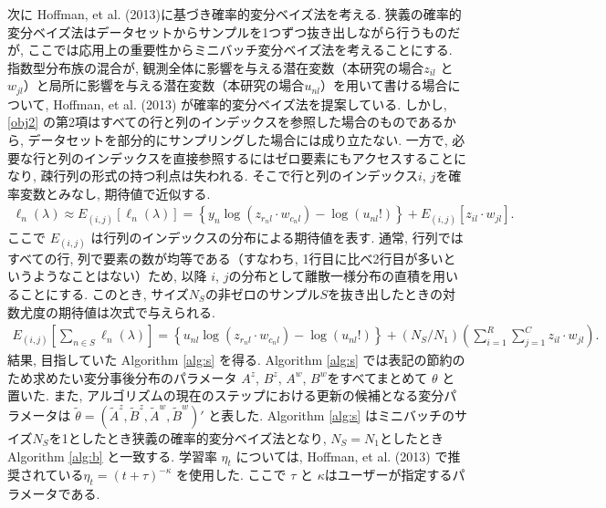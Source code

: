 \documentclass[a4paper,12pt]{jsarticle} %
\numberwithin{equation}{section} %
\begin{document}
次に Hoffman, et al. (2013)に基づき確率的変分ベイズ法を考える.
狭義の確率的変分ベイズ法はデータセットからサンプルを1つずつ抜き出しながら行うものだが, ここでは応用上の重要性からミニバッチ変分ベイズ法を考えることにする. 
指数型分布族の混合が, 観測全体に影響を与える潜在変数（本研究の場合$z_{il}$ と $w_{jl}$）と局所に影響を与える潜在変数（本研究の場合$u_{nl}$）を用いて書ける場合について, Hoffman, et al. (2013) が確率的変分ベイズ法を提案している. 
しかし,  \eqref{obj2} の第2項はすべての行と列のインデックスを参照した場合のものであるから, データセットを部分的にサンプリングした場合には成り立たない. 一方で, 必要な行と列のインデックスを直接参照するにはゼロ要素にもアクセスすることになり, 疎行列の形式の持つ利点は失われる. そこで行と列のインデックス$i$, $j$を確率変数とみなし, 期待値で近似する. 
\begin{align}
\ell_n (\lambda) \approx E_{(i,j)} [\ell_n (\lambda)] = \left\{ y_n \log(z_{r_nl} \cdot w_{c_nl})  - \log(u_{nl}!) \right\} + E_{(i,j)} [z_{il} \cdot w_{jl}].
\end{align}
ここで $E_{(i,j)}$ は行列のインデックスの分布による期待値を表す. 通常, 行列ではすべての行, 列で要素の数が均等である（すなわち, 1行目に比べ2行目が多いというようなことはない）ため, 以降 $i$, $j$の分布として離散一様分布の直積を用いることにする. このとき, サイズ$N_S$の非ゼロのサンプル$S$を抜き出したときの対数尤度の期待値は次式で与えられる.
\begin{align}
E_{(i,j)} \left[\sum_{n \in S}  \ell_n (\lambda)\right] = \left\{ u_{nl} \log(z_{r_nl} \cdot w_{c_nl})  - \log(u_{nl}!) \right\} + (N_S/N_1)\left(\sum_{i=1}^R \sum_{j=1}^C z_{il} \cdot w_{jl} \right).
\end{align}
結果, 目指していた Algorithm \ref{alg:s} を得る. Algorithm \ref{alg:s} では表記の節約のため求めたい変分事後分布のパラメータ $A^z$, $B^z$, $A^w$, $B^w$をすべてまとめて $\theta$ と置いた. また, アルゴリズムの現在のステップにおける更新の候補となる変分パラメータは $\tilde \theta =(\tilde A^z, \tilde B^z, \tilde A^w, \tilde B^w)'$ と表した. 
Algorithm \ref{alg:s} はミニバッチのサイズ$N_S$を1としたとき狭義の確率的変分ベイズ法となり, $N_S=N_1$としたときAlgorithm \ref{alg:b} と一致する.
学習率 $\eta_t$ については, Hoffman, et al. (2013) で推奨されている$\eta_t = (t+\tau)^{-\kappa}$ を使用した. ここで $\tau$ と $\kappa$はユーザーが指定するパラメータである.
\end{document}
